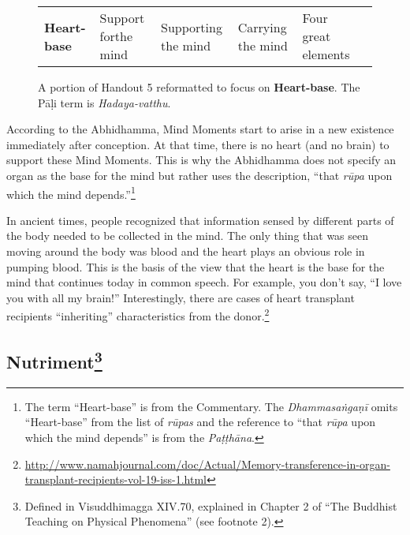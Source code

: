 \begin{figure} [H]
\setlength{\tabcolsep}{0pt}
\renewcommand{\arraystretch}{1.1}
\noindent\begin{tabular}{P{0.25\textwidth} | C{.185\textwidth} C{0.185\textwidth} C{0.185\textwidth} C{0.195\textwidth} m{0mm}}
\toprule
 &  &  &  & \\
\midrule
\textbf{Heart-base} & Support for\newline the mind & Supporting the mind & Carrying the mind & Four great elements &\\[9mm]
\bottomrule
\end{tabular} 
\caption{A portion of Handout 5 reformatted to focus on \textbf{Heart-base}. The Pāḷi term is \textit{Hadaya-vatthu}.}
\end{figure}

According to the Abhidhamma, Mind Moments start to arise in a new existence immediately after conception. At that time, there is no heart (and no brain) to support these Mind Moments. This is why the Abhidhamma does not specify an organ as the base for the mind but rather uses the description, “that \textit{rūpa} upon which the mind depends.”\footnote{The term “Heart-base” is from the Commentary. The \textit{Dhammasaṅgaṇī} omits “Heart-base” from the list of \textit{rūpas} and the reference to “that \textit{rūpa} upon which the mind depends” is from the \textit{Paṭṭhāna}.}

In ancient times, people recognized that information sensed by different parts of the body needed to be collected in the mind. The only thing that was seen moving around the body was blood and the heart plays an obvious role in pumping blood. This is the basis of the view that the heart is the base for the mind that continues today in common speech. For example, you don’t say, “I love you with all my brain!” Interestingly, there are cases of heart transplant recipients “inheriting” characteristics from the donor.\footnote{\url{http://www.namahjournal.com/doc/Actual/Memory-transference-in-organ-transplant-recipients-vol-19-iss-1.html}}

\subsection*{Nutriment\footnote{Defined in Visuddhimagga XIV.70, explained in Chapter 2 of “The Buddhist Teaching on Physical Phenomena” (see footnote 2). }}

